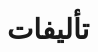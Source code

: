 \documentclass[11pt,a4paper]{bidimoderncv}
\begin{document}
\newpage
\section{تألیفات}
\def\refname{مراجع به ترتیب نزولی سال نشر آمده اند.}
\nocite{*}





%
%
\end{document}
